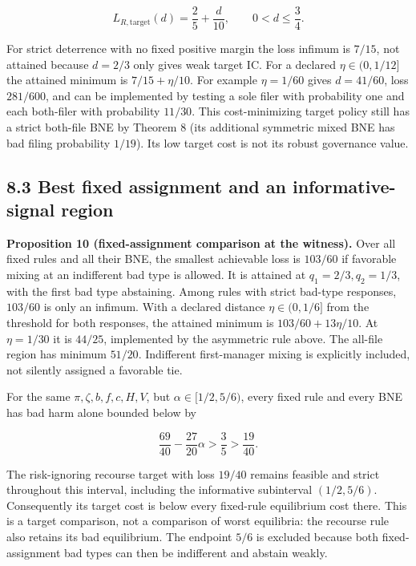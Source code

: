 \documentclass[
  11pt,
]{article}
\begin{document}
\[L_{R,\mathrm{target}}(d)=\frac25+\frac{d}{10},\qquad 0<d\leq\frac34.\]

For strict deterrence with no fixed positive margin the loss infimum is
\(7/15\), not attained because \(d=2/3\) only gives weak target IC. For
a declared \(\eta\in(0,1/12]\) the attained minimum is \(7/15+\eta/10\).
For example \(\eta=1/60\) gives \(d=41/60\), loss \(281/600\), and can
be implemented by testing a sole filer with probability one and each
both-filer with probability \(11/30\). This cost-minimizing target
policy still has a strict both-file BNE by Theorem 8 (its additional
symmetric mixed BNE has bad filing probability \(1/19\)). Its low target
cost is not its robust governance value.

\subsection{8.3 Best fixed assignment and an informative-signal
region}\label{best-fixed-assignment-and-an-informative-signal-region}

\textbf{Proposition 10 (fixed-assignment comparison at the witness).}
Over all fixed rules and all their BNE, the smallest achievable loss is
\(103/60\) if favorable mixing at an indifferent bad type is allowed. It
is attained at \(q_1=2/3,q_2=1/3\), with the first bad type abstaining.
Among rules with strict bad-type responses, \(103/60\) is only an
infimum. With a declared distance \(\eta\in(0,1/6]\) from the threshold
for both responses, the attained minimum is \(103/60+13\eta/10\). At
\(\eta=1/30\) it is \(44/25\), implemented by the asymmetric rule above.
The all-file region has minimum \(51/20\). Indifferent first-manager
mixing is explicitly included, not silently assigned a favorable tie.

For the same \(\pi,\zeta,b,f,c,H,V\), but \(\alpha\in[1/2,5/6)\), every
fixed rule and every BNE has bad harm alone bounded below by

\[\frac{69}{40}-\frac{27}{20}\alpha>\frac35>\frac{19}{40}.\]

The risk-ignoring recourse target with loss \(19/40\) remains feasible
and strict throughout this interval, including the informative
subinterval \((1/2,5/6)\). Consequently its target cost is below every
fixed-rule equilibrium cost there. This is a target comparison, not a
comparison of worst equilibria: the recourse rule also retains its bad
equilibrium. The endpoint \(5/6\) is excluded because both
fixed-assignment bad types can then be indifferent and abstain weakly.
\end{document}
